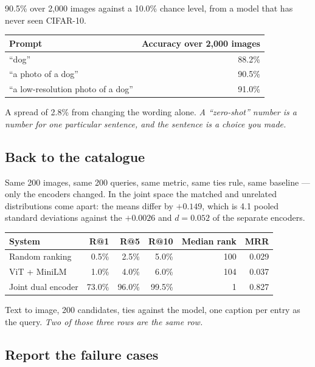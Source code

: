 \documentclass[11pt,a4paper]{article}
\begin{document}
90.5\% over 2{,}000 images against a 10.0\% chance level, from a model that has
never seen CIFAR-10.

\begin{keybox}[title={The sentence is a hyperparameter}]
\begin{center}
\small
\begin{tabular}{lr}
\toprule
\textbf{Prompt} & \textbf{Accuracy over 2{,}000 images} \\
\midrule
``dog'' & 88.2\% \\
``a photo of a dog'' & 90.5\% \\
``a low-resolution photo of a dog'' & 91.0\% \\
\bottomrule
\end{tabular}
\end{center}
A spread of 2.8\% from changing the wording alone. \emph{A ``zero-shot'' number
is a number for one particular sentence, and the sentence is a choice you
made.}
\end{keybox}

\subsection{Back to the catalogue}

Same 200 images, same 200 queries, same metric, same ties rule, same baseline
--- only the encoders changed. In the joint space the matched and unrelated
distributions come apart: the means differ by $+0.149$, which is 4.1 pooled
standard deviations against the $+0.0026$ and $d = 0.052$ of the separate
encoders.

\begin{center}
\small
\begin{tabular}{lrrrrr}
\toprule
\textbf{System} & \textbf{R@1} & \textbf{R@5} & \textbf{R@10} &
\textbf{Median rank} & \textbf{MRR} \\
\midrule
Random ranking & 0.5\% & 2.5\% & 5.0\% & 100 & 0.029 \\
ViT + MiniLM & 1.0\% & 4.0\% & 6.0\% & 104 & 0.037 \\
Joint dual encoder & 73.0\% & 96.0\% & 99.5\% & 1 & 0.827 \\
\bottomrule
\end{tabular}
\end{center}

Text to image, 200 candidates, ties against the model, one caption per entry as
the query. \emph{Two of those three rows are the same row.}

\subsection{Report the failure cases}
\end{document}
